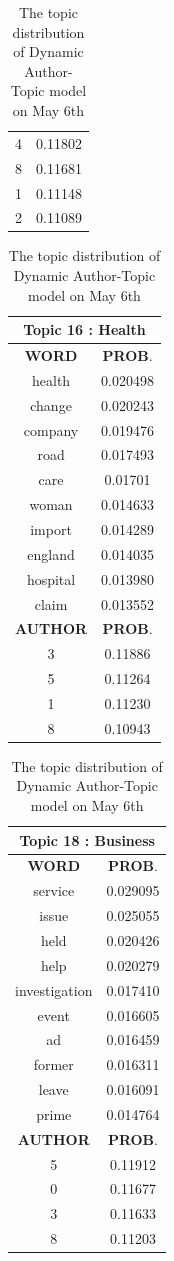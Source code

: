 \begin{table}[h!]
\begin{tabular}{|c c|}
4 &  0.11802\\
8  &   0.11681\\
1   &  0.11148\\
2   &  0.11089\\
 \hline
 \end{tabular} 
\hfill
 \begin{tabular}{|c c|} 
\hline
\multicolumn{2}{|c|}{\textbf{Topic 16 : Health}} \\
\hline
 \textbf{WORD} & \textbf{PROB}.  \\ [0.3ex] 
 \hline
	health  & 0.020498\\
	change  &  0.020243\\
	company  &  0.019476\\
	road   & 0.017493\\
	care  &  0.01701\\
	woman &   0.014633\\
	import  &  0.014289\\
	england   & 0.014035\\
	hospital  &  0.013980\\
	claim  &  0.013552\\ [1ex] 
 \hline
  \textbf{AUTHOR} & \textbf{PROB}.  \\ [0.3ex] 
 \hline
 3 &  0.11886\\
5  &   0.11264\\
1  &   0.11230\\
8  &   0.10943  \\
 \hline
 \end{tabular} 
\hfill
\begin{tabular}{|c c|} 
\hline
\multicolumn{2}{|c|}{\textbf{Topic 18 : Business}} \\
\hline
 \textbf{WORD} & \textbf{PROB}.  \\ [0.3ex] 
 \hline
 service &  0.029095 \\
	issue &     0.025055 \\
	held   &   0.020426 \\
	help   &   0.020279 \\
	investigation &     0.017410 \\
	event   &   0.016605 \\
	ad   &   0.016459 \\
	former  &    0.016311 \\
	leave   &   0.016091 \\
	prime &     0.014764 \\ [1ex] 
 \hline
  \textbf{AUTHOR} & \textbf{PROB}.  \\ [0.3ex] 
 \hline
5  & 0.11912\\
0   &  0.11677 \\
3  &   0.11633\\
8  &   0.11203  \\
 \hline
 \end{tabular} 
\hfill
\caption{The topic distribution of Dynamic Author-Topic model on May 6th}
\label{table:datat_topic_distribution}
\end{table}



